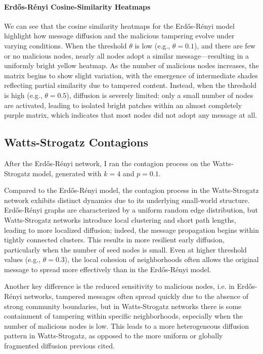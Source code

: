 \documentclass{article}
\begin{document}
\paragraph{Erd\H{o}s-R\'enyi Cosine-Similarity Heatmaps} %
We can see that the cosine similarity heatmaps for the Erd\H{o}s-R\'enyi model highlight how message diffusion and the malicious tampering evolve under varying conditions. 
When the threshold $\theta$ is low (e.g., $\theta = 0.1$), and there are few or no malicious nodes, nearly all nodes adopt a similar message—resulting in a uniformly bright yellow heatmap. As the number of malicious nodes increases, the matrix begins to show slight variation, with the emergence of intermediate shades reflecting partial similarity due to tampered content. 
Instead, when the threshold is high (e.g., $\theta = 0.5$), diffusion is severely limited: only a small number of nodes are activated, leading to isolated bright patches within an almost completely purple matrix, which indicates that most nodes did not adopt any message at all.


\subsection{Watts-Strogatz Contagions}
After the Erd\H{o}s-R\'enyi network, I ran the contagion process on the Watts-Strogatz model, generated with $k=4$ and $p=0.1$.

Compared to the Erd\H{o}s-R\'enyi model, the contagion process in the Watts-Strogatz network exhibits distinct dynamics due to its underlying small-world structure. 
Erd\H{o}s-R\'enyi graphs are characterized by a uniform random edge distribution, but Watts-Strogatz networks introduce local clustering and short path lengths, leading to more localized diffusion; indeed, the message propagation begins within tightly connected clusters. 
This results in more resilient early diffusion, particularly when the number of seed nodes is small. 
Even at higher threshold values (e.g., $\theta = 0.3$), the local cohesion of neighborhoods often allows the original message to spread more effectively than in the Erd\H{o}s-R\'enyi model.

Another key difference is the reduced sensitivity to malicious nodes, i.e. in Erd\H{o}s-R\'enyi networks, tampered messages often spread quickly due to the absence of strong community boundaries, but in Watts-Strogatz networks there is some containment of tampering within specific neighborhoods, especially when the number of malicious nodes is low. 
This leads to a more heterogeneous diffusion pattern in Watts-Strogatz, as opposed to the more uniform or globally fragmented diffusion previous cited.
\end{document}
